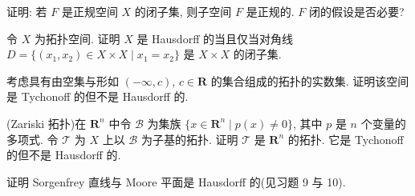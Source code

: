 \documentclass[../../main.tex]{subfiles}
\begin{document}
\begin{exercise}\label{exercise:ch11-12}
证明: 若 $F$ 是正规空间 $X$ 的闭子集, 则子空间 $F$ 是正规的. $F$ 闭的假设是否必要?
\end{exercise}

\begin{exercise}\label{exercise:ch11-13}
令 $X$ 为拓扑空间. 证明 $X$ 是 Hausdorff 的当且仅当对角线 $D=\{(x_{1},x_{2})\in X\times X\mid x_{1}=x_{2}\}$ 是 $X\times X$ 的闭子集.
\end{exercise}

\begin{exercise}\label{exercise:ch11-14}
考虑具有由空集与形如 $(-\infty,c)$, $c\in\mathbf{R}$ 的集合组成的拓扑的实数集. 证明该空间是 Tychonoff 的但不是 Hausdorff 的.
\end{exercise}

\begin{exercise}\label{exercise:ch11-15}
(Zariski 拓扑)在 $\mathbf{R}^{n}$ 中令 $\mathcal{B}$ 为集族 $\{x\in\mathbf{R}^{n}\mid p(x)\neq 0\}$, 其中 $p$ 是 $n$ 个变量的多项式. 令 $\mathcal{T}$ 为 $X$ 上以 $\mathcal{B}$ 为子基的拓扑. 证明 $\mathcal{T}$ 是 $\mathbf{R}^{n}$ 的拓扑. 它是 Tychonoff 的但不是 Hausdorff 的.
\end{exercise}

\begin{exercise}\label{exercise:ch11-16}
证明 Sorgenfrey 直线与 Moore 平面是 Hausdorff 的(见习题 9 与 10).
\end{exercise}
\end{document}
